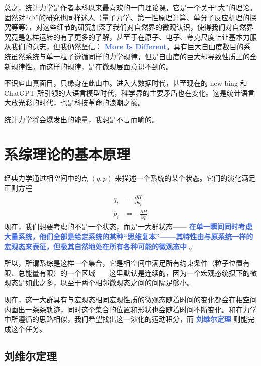 \documentclass[hyperref,UTF-8]{ctexart}
\newcommand{\0}{\boldsymbol{0}}
\begin{document}
总之，统计力学是作者本科以来最喜欢的一门理论课，它是一个关于“大”的理论。固然对“小”的研究也同样迷人（量子力学、第一性原理计算、单分子反应机理的探究等等），对这些细节的研究加深了我们对自然界的微观认识，使得我们对自然界究竟是怎样运转的有了更多的了解，甚至于在原子、电子、夸克尺度上让基本力服从我们的意志，但我仍然坚信： \textcolor{RoyalBlue}{\textbf{\kaishu More Is Different}}。具有巨大自由度数目的系统虽然系统与单一粒子遵循同样的力学规律，但是自由度的巨大却导致性质上的全新规律性。而这样的规律，是在微观层面意识不到的。

不识庐山真面目，只缘身在此山中。进入大数据时代，甚至现在的 new bing 和 ChatGPT 所引领的大语言模型时代，科学界的主要矛盾也在变化。这是统计语言大放光彩的时代，也是科技革命的浪潮之巅。

统计力学将会爆发出的能量，我想是不言而喻的。

\pagebreak 


\section{系综理论的基本原理}

经典力学通过相空间中的点 $(q,p)$ 来描述一个系统的某个状态。它们的演化满足正则方程
\begin{align*}
    \dot{q_i} &= \frac{\partial H}{\partial p_i} \\
    \dot{p_i} &= -\frac{\partial H}{\partial q_i}
\end{align*}
现在，我们想要考虑的不是一个状态，而是一大群状态——  \textcolor{RoyalBlue}{\textbf{\kaishu 在单一瞬间同时考虑大量系统，他们全部是给定系统的某种“思维复本”——其特性由与原系统一样的宏观态来表征，但极其自然地处在所有各种可能的微观态中}} \cite{Pathria}。

所以，所谓系综是这样一个集合，它是相空间中满足所有约束条件（粒子位置有限、总能量有限）的一个区域——这里默认是连续的，因为一个宏观态统摄下的微观态是如此之多，以至于两个相邻微观态之间的间隔足够小。

现在，这一大群具有与宏观态相同宏观性质的微观态随着时间的变化都会在相空间内画出一条条轨迹，同时这个集合的位置和形状也会随着时间不断变化。和在力学中所遵循的思路相似，我们希望找出这一演化的运动积分，而 \textcolor{RoyalBlue}{\textbf{\kaishu 刘维尔定理}} 则能完成这个任务。

\subsection{刘维尔定理}
\end{document}
